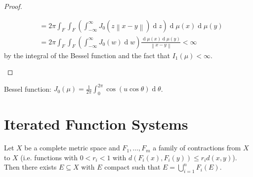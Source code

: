 \documentclass[11pt, a4paper]{memoir}
\newcommand{\norm}[1]{\ensuremath{\left\lVert#1\right\rVert}}
\theoremstyle{change}
\theoremstyle{plain}
\theoremstyle{nonumberplain}
\newtheorem{proof}{Proof}
\renewcommand{\d}[1]{\ensuremath{\operatorname{d}\!{#1}}}
\numberwithin{equation}{section}
\begin{document}
\begin{proof}
\begin{enumerate}[nl,r]
\begin{align*}
                                                                                                &= 2\pi\int_F\int_F\left(\int_{-\infty}^\infty J_0(z\norm{x-y})\d{z}\right)\d{\mu(x)}\d{\mu(y)}\\
                                                                                                &= 2\pi\int_F\int_F\left(\int_{-\infty}^\infty J_0(w)\d{w}\right)\frac{\d{\mu(x)}\d{\mu(y)}}{\norm{x-y}}<\infty
            \end{align*}
            by the integral of the Bessel function and the fact that $I_1(\mu)<\infty$.
    \end{enumerate}
\end{proof}
Bessel function: $J_0(\mu)=\frac{1}{2\pi}\int_0^{2\pi}\cos(u\cos\theta)\d{\theta}$.
\section{Iterated Function Systems}
Let $X$ be a complete metric space and $F_1,\ldots,F_m$ a family of contractions from $X$ to $X$ (i.e. functions with $0<r_i<1$ with $d(F_i(x),F_i(y))\leq r_id(x,y)$).
Then there exists $E\subseteq X$ with $E$ compact such that $E=\bigcup_{i=1}^n F_i(E)$.
\end{document}
